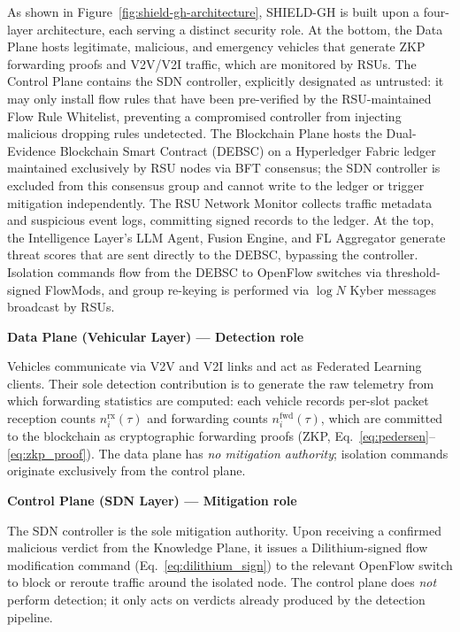 \documentclass[12pt, a4paper]{report}
\newcommand{\mypar}{\vspace{0.8em}\noindent}
\begin{document}
As shown in Figure~\ref{fig:shield-gh-architecture}, SHIELD-GH is built upon a four-layer architecture, each serving a distinct security role. At the bottom, the Data Plane hosts legitimate, malicious, and emergency vehicles that generate ZKP forwarding proofs and V2V/V2I traffic, which are monitored by RSUs. The Control Plane contains the SDN controller, explicitly designated as untrusted: it may only install flow rules that have been pre-verified by the RSU-maintained Flow Rule Whitelist, preventing a compromised controller from injecting malicious dropping rules undetected. The Blockchain Plane hosts the Dual-Evidence Blockchain Smart Contract (DEBSC) on a Hyperledger Fabric ledger maintained exclusively by RSU nodes via BFT consensus; the SDN controller is excluded from this consensus group and cannot write to the ledger or trigger mitigation independently. The RSU Network Monitor collects traffic metadata and suspicious event logs, committing signed records to the ledger. At the top, the Intelligence Layer's LLM Agent, Fusion Engine, and FL Aggregator generate threat scores that are sent directly to the DEBSC, bypassing the controller. Isolation commands flow from the DEBSC to OpenFlow switches via threshold-signed FlowMods, and group re-keying is performed via $\log N$ Kyber messages broadcast by RSUs.

\mypar
\textbf{Data Plane (Vehicular Layer) — Detection role}

\mypar
Vehicles communicate via V2V and V2I links and act as Federated Learning clients. Their sole detection contribution is to generate the raw telemetry from which forwarding statistics are computed: each vehicle records per-slot packet reception counts $n_i^{\text{rx}}(\tau)$ and forwarding counts $n_i^{\text{fwd}}(\tau)$, which are committed to the blockchain as cryptographic forwarding proofs (ZKP, Eq.~\eqref{eq:pedersen}--\eqref{eq:zkp_proof}). The data plane has \emph{no mitigation authority}; isolation commands originate exclusively from the control plane.

\mypar
\textbf{Control Plane (SDN Layer) — Mitigation role}

\mypar
The SDN controller is the sole mitigation authority. Upon receiving a confirmed malicious verdict from the Knowledge Plane, it issues a Dilithium-signed flow modification command (Eq.~\eqref{eq:dilithium_sign}) to the relevant OpenFlow switch to block or reroute traffic around the isolated node. The control plane does \emph{not} perform detection; it only acts on verdicts already produced by the detection pipeline.
\end{document}
